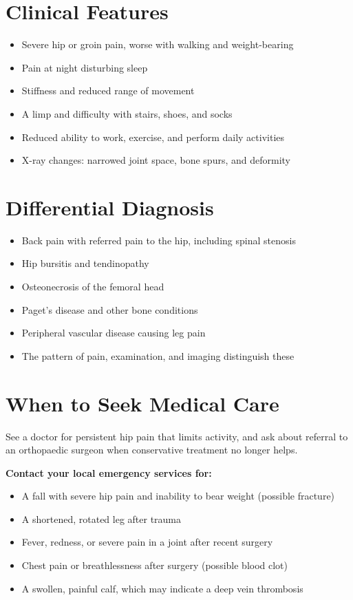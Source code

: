 \section*{Clinical Features}
\begin{itemize}
    \item Severe hip or groin pain, worse with walking and weight-bearing
    \item Pain at night disturbing sleep
    \item Stiffness and reduced range of movement
    \item A limp and difficulty with stairs, shoes, and socks
    \item Reduced ability to work, exercise, and perform daily activities
    \item X-ray changes: narrowed joint space, bone spurs, and deformity
\end{itemize}

\section*{Differential Diagnosis}
\begin{itemize}
    \item Back pain with referred pain to the hip, including spinal stenosis
    \item Hip bursitis and tendinopathy
    \item Osteonecrosis of the femoral head
    \item Paget's disease and other bone conditions
    \item Peripheral vascular disease causing leg pain
    \item The pattern of pain, examination, and imaging distinguish these
\end{itemize}

\section*{When to Seek Medical Care}
See a doctor for persistent hip pain that limits activity, and ask about referral to an orthopaedic surgeon when conservative treatment no longer helps.

\textbf{Contact your local emergency services for:}
\begin{itemize}
    \item A fall with severe hip pain and inability to bear weight (possible fracture)
    \item A shortened, rotated leg after trauma
    \item Fever, redness, or severe pain in a joint after recent surgery
    \item Chest pain or breathlessness after surgery (possible blood clot)
    \item A swollen, painful calf, which may indicate a deep vein thrombosis
\end{itemize}

